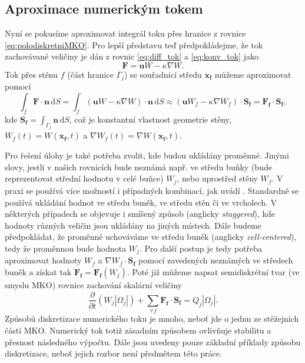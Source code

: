 \subsection{Aproximace numerickým tokem}

Nyní se pokusíme aproximovat integrál toku přes hranice z rovnice \ref{eq:polodiskretniMKO}. Pro lepší představu teď předpokládejme, že tok zachovávané veličiny je dán z rovnic \ref{eq:diff_tok} a \ref{eq:konv_tok} jako
\begin{equation}
\mathbf{F}=\mathbf{u}W-\kappa \nabla W.
\end{equation}
Tok přes stěnu $f$ (část hranice $\Gamma_j$) se souřadnicí středu $\mathbf{x_f}$ můžeme aproximovat pomocí
\begin{equation}\label{eq:aprox_tok}
\int_{f}\mathbf{F}\cdot \mathbf{n} \,\mathrm{d}S
=
\int_{f}(\mathbf{u}W-\kappa\nabla W)\cdot \mathbf{n}\, \mathrm{d}S 
\approx 
\left(\mathbf{u} W_f - \kappa \nabla W_f \right) \cdot \mathbf{S_f} 
= 
\mathbf{F_f} \cdot \mathbf{S_f},
\end{equation}
kde $\mathbf{S_f}=\int_{\Gamma_j}\mathbf{n}\,\mathrm{d}S$, což je konstantní vlastnost geometrie stěny, $W_f(t) = W(\mathbf{x_f},t)$ a $\nabla W_f(t) = \nabla W (\mathbf{x_f}, t)$.

Pro řešení úlohy je také potřeba zvolit, kde budou ukládány proměnné. Jinými slovy, jestli v našich rovnicích bude neznámá např. ve středu buňky (bude reprezentovat střední hodnotu v celé buňce) $W_j$, nebo uprostřed stěny $W_f$. V praxi se používá více možností i případných kombinací, jak uvádí \cite{blazek2015computational, hirsch2007numerical}.
Standardně se používá ukládání hodnot ve středu buněk, ve středu stěn či ve vrcholech.
V některých případech se objevuje i smíšený způsob (anglicky \textit{staggered}), kde hodnoty různých veličin jsou ukládány na jiných místech.
Dále budeme předpokládat, že proměnné uchováváme ve středu buněk (anglicky \textit{cell-centered}), tedy že proměnnou bude hodnota $W_j$.
Pro další postup je tedy potřeba aproximovat hodnoty $W_f$ a $\nabla W_f \cdot \mathbf{S_f}$ pomocí zavedených neznámých ve středech buněk a získat tak $ \mathbf{F_f} = \mathbf{F_f}(W_j)$.
Poté již můžeme napsat semidiskrétní tvar (ve smyslu MKO) rovnice zachování skalární veličiny 
\begin{equation}
\frac{\partial}{\partial t} (W_j|\Omega_j|) + \sum_{\forall f} \mathbf{F_f} \cdot \mathbf{S_f} = Q_j|\Omega_j|.
\end{equation}
Způsobů diskretizace numerického toku je mnoho, neboť jde o jednu ze stěžejních částí MKO. Numerický tok totiž zásadním způsobem ovlivňuje stabilitu a přesnost následného výpočtu. Dále jsou uvedeny pouze základní příklady způsobu diskretizace, neboť jejich rozbor není předmětem této práce.

